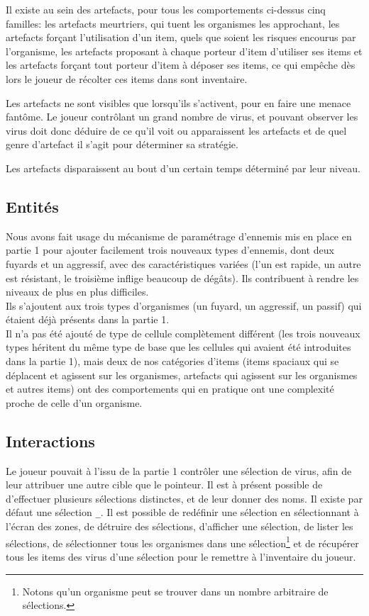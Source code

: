 \documentclass[a4paper,french]{article}
\begin{document}
\medskip

Il existe au sein des artefacts, pour tous les comportements ci-dessus cinq
familles: les artefacts meurtriers, qui tuent les organismes les approchant,
les artefacts forçant l'utilisation d'un item, quels que soient les risques
encourus par l'organisme, les artefacts proposant à chaque porteur d'item
d'utiliser ses items et les artefacts forçant tout porteur d'item à déposer ses
items, ce qui empêche dès lors le joueur de récolter ces items dans sont
inventaire.
\medskip

Les artefacts ne sont visibles que lorsqu'ils s'activent, pour en
faire une menace fantôme. Le joueur contrôlant un grand nombre de virus, et
pouvant observer les virus doit donc déduire de ce qu'il voit ou apparaissent
les artefacts et de quel genre d'artefact il s'agit pour déterminer sa
stratégie.

Les artefacts disparaissent au bout d'un certain temps déterminé par leur
niveau.


\subsection{Entit\'es}
Nous avons fait usage du m\'ecanisme de param\'etrage d'ennemis mis en place en partie 1 pour ajouter facilement trois nouveaux
types d'ennemis, dont deux fuyards et un aggressif, avec des caract\'eristiques vari\'ees (l'un est rapide, un autre est r\'esistant, le troisi\`eme
inflige beaucoup de d\'eg\^ats). Ils contribuent \`a rendre les niveaux de plus en plus difficiles.\\
Ils s'ajoutent aux trois types d'organismes (un fuyard, un aggressif, un passif) qui \'etaient d\'ej\`a pr\'esents dans la partie 1.\\

Il n'a pas \'et\'e ajout\'e de type de cellule compl\`etement diff\'erent (les trois nouveaux types h\'eritent du m\^eme type de base que
les cellules qui avaient \'et\'e introduites dans la partie 1), mais deux de nos cat\'egories d'items (items spaciaux qui se d\'eplacent et agissent sur
les organismes, artefacts qui agissent sur les organismes et autres items) ont des comportements qui en pratique
ont une complexit\'e proche de celle d'un organisme.

\subsection{Interactions}
Le joueur pouvait à l'issu de la partie 1 contrôler une sélection de virus, afin
de leur attribuer une autre cible que le pointeur. Il est à présent possible de
d'effectuer plusieurs sélections distinctes, et de leur donner des noms. Il
existe par défaut une sélection \texttt\_. Il est possible de redéfinir une
sélection en sélectionnant à l'écran des zones, de détruire des sélections,
d'afficher une sélection, de lister les sélections, de sélectionner tous les
organismes dans une sélection\footnote{Notons qu'un organisme peut se trouver
dans un nombre arbitraire de sélections.} et de récupérer tous les items des
virus d'une sélection pour le remettre à l'inventaire du joueur.\\
\end{document}
